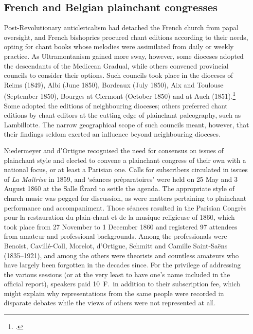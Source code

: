 \subsection{French and Belgian plainchant congresses}
Post-Revolutionary anticlericalism had detached the French church from papal oversight, and French bishoprics procured chant editions according to their needs, opting for chant books whose melodies were assimilated from daily or weekly practice.
As Ultramontanism gained more sway, however, some dioceses adopted the descendants of the Medicean Gradual, while others convened provincial councils to consider their options.
Such councils took place in the dioceses of Reims (1849), Albi (June 1850), Bordeaux (July 1850), Aix and Toulouse (September 1850), Bourges at Clermont (October 1850) and at Auch (1851).\footcite[col. 3]{DOrtigueEpiscopatparle1860}
Some adopted the editions of neighbouring dioceses; others preferred chant editions by chant editors at the cutting edge of plainchant paleography, such as Lambillotte.
The narrow geographical scope of such councils meant, however, that their findings seldom exerted an influence beyond neighbouring dioceses.

Niedermeyer and d'Ortigue recognised the need for consensus on issues of plainchant style and elected to convene a plainchant congress of their own with a national focus, or at least a Parisian one.
Calls for subscribers circulated in issues of \textit{La Maîtrise} in 1859, and `séances préparatoires' were held on 25 May and 3 August 1860 at the Salle Érard to settle the agenda.
The appropriate style of church music was pegged for discussion, as were matters pertaining to plainchant performance and accompaniment.
Those séances resulted in the Parisian Congrès pour la restauration du plain-chant et de la musique religieuse of 1860, which took place from 27 November to 1 December 1860 and registered 97 attendees from amateur and professional backgrounds.
Among the professionals were Benoist, Cavillé-Coll, Morelot, d'Ortigue, Schmitt and Camille Saint-Saëns (1835--1921), and among the others were theorists and countless amateurs who have largely been forgotten in the decades since.
For the privilege of addressing the various sessions (or at the very least to have one's name included in the official report), speakers paid 10~F.\ in addition to their subscription fee, which might explain why representations from the same people were recorded in disparate debates while the views of others were not represented at all.
\nowidow[2]

